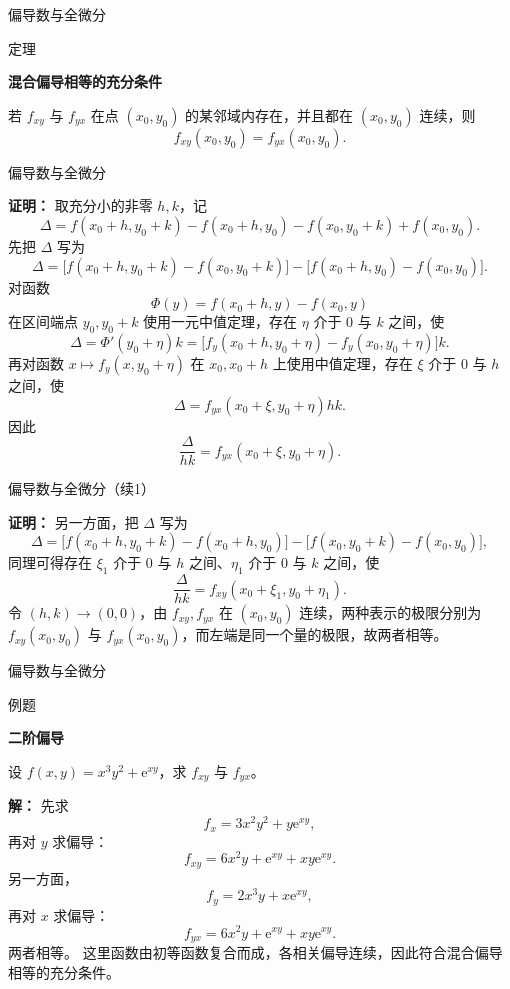 \documentclass[aspectratio=169,10pt,fontset=fandol]{ctexbeamer}
\newcommand{\ee}{\mathrm{e}}
\begin{document}
\begin{frame}[t,fragile]{偏导数与全微分}
\normalsize
\begin{block}{定理}
{\normalsize
\textbf{混合偏导相等的充分条件}\par

若 $f_{xy}$ 与 $f_{yx}$ 在点 $(x_0,y_0)$ 的某邻域内存在，并且都在 $(x_0,y_0)$ 连续，则
\[
f_{xy}(x_0,y_0)=f_{yx}(x_0,y_0).
\]

}
\end{block}
\end{frame}
\begin{frame}[t,fragile]{偏导数与全微分}
\footnotesize
{\footnotesize
\textbf{证明：}
取充分小的非零 $h,k$，记
\[
\Delta=f(x_0+h,y_0+k)-f(x_0+h,y_0)-f(x_0,y_0+k)+f(x_0,y_0).
\]
先把 $\Delta$ 写为
\[
\Delta=\bigl[f(x_0+h,y_0+k)-f(x_0,y_0+k)\bigr]
-\bigl[f(x_0+h,y_0)-f(x_0,y_0)\bigr].
\]
对函数
\[
\Phi(y)=f(x_0+h,y)-f(x_0,y)
\]
在区间端点 $y_0,y_0+k$ 使用一元中值定理，存在 $\eta$ 介于 $0$ 与 $k$ 之间，使
\[
\Delta=\Phi'(y_0+\eta)k
=\bigl[f_y(x_0+h,y_0+\eta)-f_y(x_0,y_0+\eta)\bigr]k.
\]
再对函数 $x\mapsto f_y(x,y_0+\eta)$ 在 $x_0,x_0+h$ 上使用中值定理，存在 $\xi$ 介于 $0$ 与 $h$ 之间，使
\[
\Delta=f_{yx}(x_0+\xi,y_0+\eta)hk.
\]
因此
\[
\frac{\Delta}{hk}=f_{yx}(x_0+\xi,y_0+\eta).
\]


}
\end{frame}
\begin{frame}[t,fragile]{偏导数与全微分（续1）}
\normalsize
{\normalsize
\textbf{证明：}
另一方面，把 $\Delta$ 写为
\[
\Delta=\bigl[f(x_0+h,y_0+k)-f(x_0+h,y_0)\bigr]
-\bigl[f(x_0,y_0+k)-f(x_0,y_0)\bigr],
\]
同理可得存在 $\xi_1$ 介于 $0$ 与 $h$ 之间、$\eta_1$ 介于 $0$ 与 $k$ 之间，使
\[
\frac{\Delta}{hk}=f_{xy}(x_0+\xi_1,y_0+\eta_1).
\]
令 $(h,k)\to(0,0)$，由 $f_{xy},f_{yx}$ 在 $(x_0,y_0)$ 连续，两种表示的极限分别为 $f_{xy}(x_0,y_0)$ 与 $f_{yx}(x_0,y_0)$，而左端是同一个量的极限，故两者相等。

}
\end{frame}
\begin{frame}[t,fragile]{偏导数与全微分}
\footnotesize
\begin{block}{例题}
{\footnotesize
\textbf{二阶偏导}\par

设 $f(x,y)=x^3y^2+\ee^{xy}$，求 $f_{xy}$ 与 $f_{yx}$。

}
\end{block}
\pause
{\footnotesize
\textbf{解：}
先求
\[
f_x=3x^2y^2+y\ee^{xy},
\]
再对 $y$ 求偏导：
\[
f_{xy}=6x^2y+\ee^{xy}+xy\ee^{xy}.
\]
另一方面，
\[
f_y=2x^3y+x\ee^{xy},
\]
再对 $x$ 求偏导：
\[
f_{yx}=6x^2y+\ee^{xy}+xy\ee^{xy}.
\]
两者相等。 这里函数由初等函数复合而成，各相关偏导连续，因此符合混合偏导相等的充分条件。

}
\end{frame}
\end{document}
